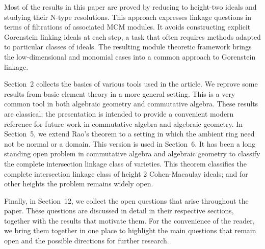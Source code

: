 \documentclass[11pt,letterpaper]{amsart}
\theoremstyle{plain}
\theoremstyle{definition}
\theoremstyle{remark}
\begin{document}
Most of the results in this paper are proved by reducing to height-two ideals
and studying their N-type resolutions. This approach expresses linkage questions in terms of filtrations of associated MCM modules. It avoids
constructing explicit Gorenstein linking ideals at each step, a task that often requires methods adapted to
particular classes of ideals. The resulting module theoretic framework brings the low-dimensional and monomial cases into a common
approach to Gorenstein linkage.

Section~2 collects the basics of various tools used in the article. We reprove some results from basic element theory in a more general setting. This is a very common tool in both algebraic geometry and commutative algebra. These results are classical; the presentation is intended to provide a convenient modern reference for future
work in commutative algebra and algebraic geometry. In Section~5, we extend Rao’s theorem \cite{rao1981liaison} to a setting in which the ambient ring need not be normal or a
domain. This version is used in Section~6. It has been a long standing open problem in commutative algebra and algebraic geometry to classify the complete intersection linkage class of varieties. This theorem classifies the complete intersection linkage class of height 2 Cohen-Macaulay ideals; and for other heights the problem remains widely open. 

Finally, in Section~12, we collect the open questions that arise throughout the paper. These questions are discussed in detail in their respective sections, together with the results that motivate them. For the convenience of the reader, we bring them together in one place to highlight the main questions that remain open and the possible directions for further research.
\end{document}
